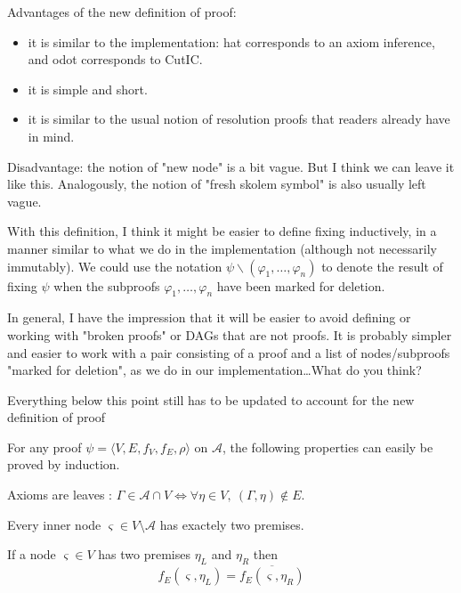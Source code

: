 \documentclass{llncs}
\begin{document}
\begin{bwp}
Advantages of the new definition of proof: 
\begin{itemize}
\item it is similar to the implementation: hat corresponds to an axiom inference, and odot corresponds to CutIC.
\item it is simple and short.
\item it is similar to the usual notion of resolution proofs that readers already have in mind.
\end{itemize}

Disadvantage: the notion of "new node" is a bit vague. But I think we can leave it like this. Analogously, the notion of "fresh skolem symbol" is also usually left vague.

With this definition, I think it might be easier to define fixing inductively, in a manner similar to what we do in the implementation (although not necessarily immutably). We could use the notation $\psi \backslash (\varphi_1,\ldots, \varphi_n)$ to denote the result of fixing $\psi$ when the subproofs $\varphi_1, \ldots, \varphi_n$ have been marked for deletion.

In general, I have the impression that it will be easier to avoid defining or working with "broken proofs" or DAGs that are not proofs. It is probably simpler and easier to work with a pair consisting of a proof and a list of nodes/subproofs "marked for deletion", as we do in our implementation\ldots  What do you think?

Everything below this point still has to be updated to account for the new definition of proof
\end{bwp}

For any proof $\psi = \langle V,E,f_V,f_E,\rho \rangle$ on $\mathcal{A}$, the following properties
can easily be proved by induction.

\begin{property}
\label{prop:proof_leaf}
Axioms are leaves : $\Gamma \in \mathcal{A} \cap V \Leftrightarrow \forall \eta \in V ,~
(\Gamma,\eta) \notin E$.
\end{property}

\begin{property}
Every inner node $\varsigma \in V \setminus \mathcal{A}$ has exactely two premises.
\end{property}

\begin{property}
\label{prop:proof_edges}
If a node $\varsigma \in V$ has two premises $\eta_L$ and $\eta_R$ then
\begin{equation*}
f_E(\varsigma,\eta_L) = \overline{f_E(\varsigma,\eta_R)}
\end{equation*}
\end{property}
\end{document}
